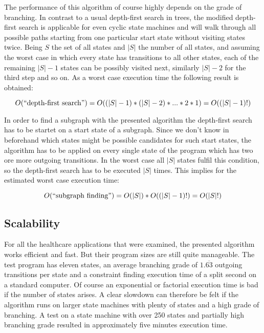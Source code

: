 The performance of this algorithm of course highly depends on the grade of branching. In contrast to a usual depth-first search in trees, the modified depth-first search is applicable for even cyclic state machines and will walk through all possible paths starting from one particular start state without visiting states twice. Being $S$ the set of all states and $|S|$ the number of all states, and assuming the worst case in which every state has transitions to all other states, each of the remaining $|S|-1$ states can be possibly visited next, similarly $|S|-2$ for the third step and so on. As a worst case execution time the following result is obtained:


\begin{equation}
O(\textnormal{``depth-first search''})=O((|S|-1)*(|S|-2)*...*2*1)=O((|S|-1)!)
\end{equation}

In order to find a subgraph with the presented algorithm the depth-first search has to be startet on a start state of a subgraph. Since we don't know in beforehand which states might be possible candidates for such start states, the algorithm has to be applied on every single state of the program which has two ore more outgoing transitions. In the worst case all $|S|$ states fulfil this condition, so the depth-first search has to be executed $|S|$ times. This implies for the estimated worst case execution time:

\begin{equation}
O(\textnormal{``subgraph finding''})=O(|S|)*O((|S|-1)!)=O(|S|!)
\end{equation}



\subsection{Scalability}

For all the healthcare applications that were examined, the presented algorithm works efficient and fast. But their program sizes are still quite manageable. The test program has eleven states, an average branching grade of $1.\overline{63}$ outgoing transitions per state and a constraint finding execution time of a split second on a standard computer.
Of course an exponential or factorial execution time is bad if the number of states arises. A clear slowdown can therefore be felt if the algorithm runs on larger state machines with plenty of states and a high grade of branching. A test on a state machine with over 250 states and partially high branching grade resulted in approximately five minutes execution time.

